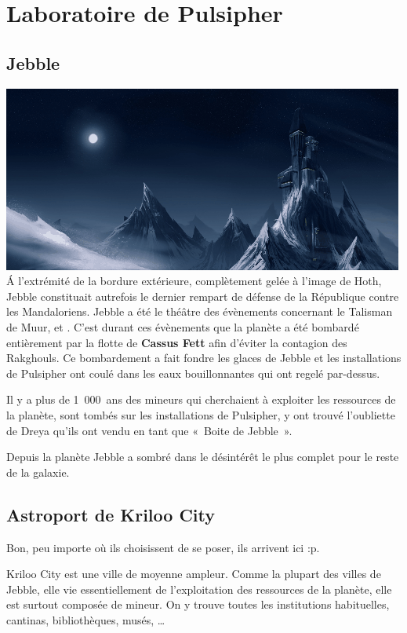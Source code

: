\section{Laboratoire de Pulsipher}

\subsection{Jebble}\label{sec:jebble}
\noindent\includegraphics[width=\linewidth]{_img/dos-au-muur/jebble.png}
\'A l’extrémité de la bordure extérieure, complètement gelée à l’image de Hoth, Jebble constituait autrefois le dernier rempart de défense de la République contre les Mandaloriens. Jebble a été le théâtre des évènements concernant le Talisman de Muur,  et . C’est durant ces évènements que la planète a été bombardé entièrement par la flotte de \textbf{Cassus Fett} afin d’éviter la contagion des Rakghouls. Ce bombardement a fait fondre les glaces de Jebble et les installations de Pulsipher ont coulé dans les eaux bouillonnantes qui ont regelé par-dessus.

Il y a plus de 1~000~ans des mineurs qui cherchaient à exploiter les ressources de la planète, sont tombés sur les installations de Pulsipher, y ont trouvé l’oubliette de Dreya qu’ils ont vendu en tant que «~Boite de Jebble~».

Depuis la planète Jebble a sombré dans le désintérêt le plus complet pour le reste de la galaxie.

\subsection{Astroport de Kriloo City}
Bon, peu importe où ils choisissent de se poser, ils arrivent ici :p.

Kriloo City est une ville de moyenne ampleur. Comme la plupart des villes de Jebble, elle vie essentiellement de l’exploitation des ressources de la planète, elle est surtout composée de mineur. On y trouve toutes les institutions habituelles, cantinas, bibliothèques, musés, \ldots

